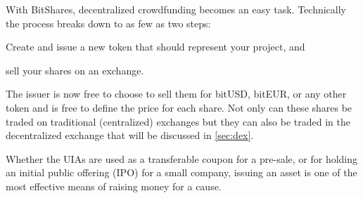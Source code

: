 With BitShares, decentralized crowdfunding becomes an easy task. Technically
the process breaks down to as few as two steps:
\begin{inparaenum}[(a)]
 \item Create and issue a new token that should represent your project, and 
 \item sell your shares on an exchange.
\end{inparaenum}
The issuer is now free to choose to sell them for bitUSD, bitEUR, or any other
token and is free to define the price for each share. Not only can these shares
be traded on traditional (centralized) exchanges but they can also be traded in
the decentralized exchange that will be discussed in \cref{sec:dex}.

Whether the UIAs are used as a transferable coupon for a pre-sale, or for
holding an initial public offering (IPO) for a small company, issuing an asset
is one of the most effective means of raising money for a cause.
